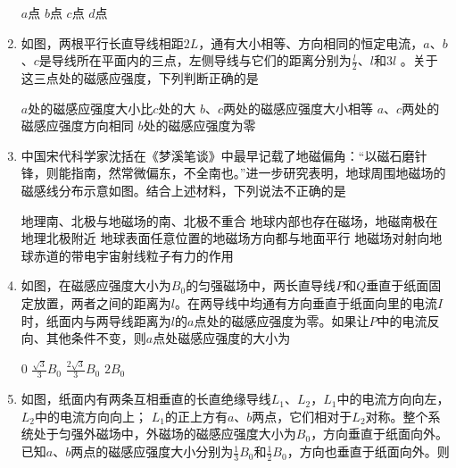 \begin{enumerate}
\fourchoices
{$ a $点}
{$ b $点}
{$ c $点}
{$ d $点}





\item
{}
如图，两根平行长直导线相距$ 2L $，通有大小相等、方向相同的恒定电流，$ a $、$ b $、$ c $是导线所在平面内的三点，左侧导线与它们的距离分别为$ \frac{l}{2} $、$ l $和$ 3l $ 。关于这三点处的磁感应强度，下列判断正确的是  
\begin{figure}[h!]
\centering

\end{figure}

\fourchoices
{$ a $处的磁感应强度大小比$ c $处的大}
{$ b $、$ c $两处的磁感应强度大小相等}
{$ a $、$ c $两处的磁感应强度方向相同}
{$ b $处的磁感应强度为零}







\item
{}
中国宋代科学家沈括在《梦溪笔谈》中最早记载了地磁偏角：“以磁石磨针锋，则能指南，然常微偏东，不全南也。”进一步研究表明，地球周围地磁场的磁感线分布示意如图。结合上述材料，下列说法不正确的是  
\begin{figure}[h!]
\centering

\end{figure}

\fourchoices
{地理南、北极与地磁场的南、北极不重合}
{地球内部也存在磁场，地磁南极在地理北极附近}
{地球表面任意位置的地磁场方向都与地面平行}
{地磁场对射向地球赤道的带电宇宙射线粒子有力的作用}



\item
{}
如图，在磁感应强度大小为$ B_{0} $的匀强磁场中，两长直导线$ P $和$ Q $垂直于纸面固定放置，两者之间的距离为$ l $。在两导线中均通有方向垂直于纸面向里的电流$ I $时，纸面内与两导线距离为$ l $的$ a $点处的磁感应强度为零。如果让$ P $中的电流反向、其他条件不变，则$ a $点处磁感应强度的大小为  
\begin{figure}[h!]
\centering

\end{figure}
\fourchoices
{$ 0 $}
{$\frac { \sqrt { 3 } } { 3 } B _ { 0 }$}
{$\frac { 2 \sqrt { 3 } } { 3 } B _ { 0 }$}
{$2 B _ { 0 }$}





\item
{}
如图，纸面内有两条互相垂直的长直绝缘导线$ L_{1} $、$ L_{2} $，$ L_{1} $中的电流方向向左，$ L_{2} $中的电流方向向上； $ L_{1} $的正上方有$ a $、$ b $两点，它们相对于$ L_{2} $对称。整个系统处于匀强外磁场中，外磁场的磁感应强度大小为$ B_{0} $，方向垂直于纸面向外。已知$ a $、$ b $两点的磁感应强度大小分别为$ \frac{ 1 }{ 3 } B_{0} $和$ \frac{ 1 }{ 2 } B_{0} $，方向也垂直于纸面向外。则  
\begin{figure}[h!]
\centering

\end{figure}



\end{enumerate}
